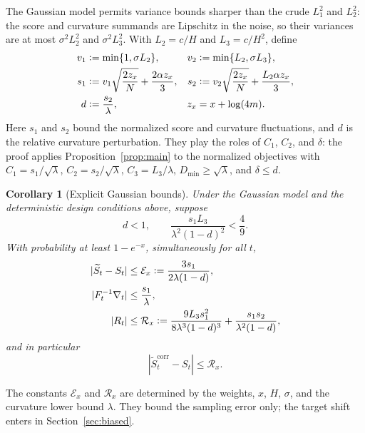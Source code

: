 \documentclass[11pt]{article}
\newcommand{\eqdef}{\mathrel{\vcentcolon=}}
\newcommand{\IMFs}{S}
\newcommand{\IMFt}{\widetilde S}
\newcommand{\IF}{F}
\newcommand{\DFN}{D}
\newtheorem{corollary}[proposition]{Corollary}
\theoremstyle{definition}
\begin{document}
The Gaussian model permits variance bounds sharper than the crude
\(L_1^2\) and \(L_2^2\): the score and curvature summands are Lipschitz in
the noise, so their variances are at most \(\sigma^2L_2^2\) and
\(\sigma^2L_3^2\).  With \(L_2=c/H\) and \(L_3=c/H^2\), define
\begin{align}
  v_1&\eqdef\min\{1,\sigma L_2\},&
  v_2&\eqdef\min\{L_2,\sigma L_3\},\notag\\
  s_1&\eqdef v_1\sqrt{\frac{2z_x}{N}}+\frac{2\alpha z_x}{3},&
  s_2&\eqdef v_2\sqrt{\frac{2z_x}{N}}+\frac{L_2\alpha z_x}{3},\notag\\
  d&\eqdef\frac{s_2}{\lambda},&
  z_x&=x+\log(4m).
  \label{eq:gaussian-tail-constants}
\end{align}
Here \(s_1\) and \(s_2\) bound the normalized score and curvature
fluctuations, and \(d\) is the relative curvature perturbation.  They play
the roles of \(C_1\), \(C_2\), and \(\delta\): the proof applies
Proposition~\ref{prop:main} to the normalized objectives with
\(C_1=s_1/\sqrt\lambda\), \(C_2=s_2/\sqrt\lambda\), \(C_3=L_3/\lambda\),
\(\DFN_{\min}\geq\sqrt\lambda\), and \(\delta\leq d\).

\begin{corollary}[Explicit Gaussian bounds]\label{cor:gaussian}
Under the Gaussian model and the deterministic design conditions above, suppose
\begin{equation}
  d<1,\qquad
  \frac{s_1L_3}{\lambda^2(1-d)^2}<\frac49.
  \label{eq:gaussian-smallness}
\end{equation}
With probability at least \(1-e^{-x}\), simultaneously for all \(t\),
\begin{align}
  |\IMFt_t-\IMFs_t|
    &\leq\mathcal E_x\eqdef\frac{3s_1}{2\lambda(1-d)},
      \label{eq:gaussian-raw}\\
  |\IF_t^{-1}\nabla_t|&\leq\frac{s_1}{\lambda},
      \label{eq:gaussian-leading}\\
  |R_t|&\leq\mathcal R_x
     \eqdef\frac{9L_3s_1^2}{8\lambda^3(1-d)^3}
            +\frac{s_1s_2}{\lambda^2(1-d)},
      \label{eq:gaussian-remainder}
\end{align}
and in particular
\begin{equation}
  |\IMFt_t^{\mathrm{corr}}-\IMFs_t|\leq\mathcal R_x.
  \label{eq:gaussian-corrected}
\end{equation}
\end{corollary}

The constants \(\mathcal E_x\) and \(\mathcal R_x\) are determined by the
weights, \(x\), \(H\), \(\sigma\), and the curvature lower bound
\(\lambda\).  They bound the sampling error only; the target shift enters in
Section~\ref{sec:biased}.
\end{document}
